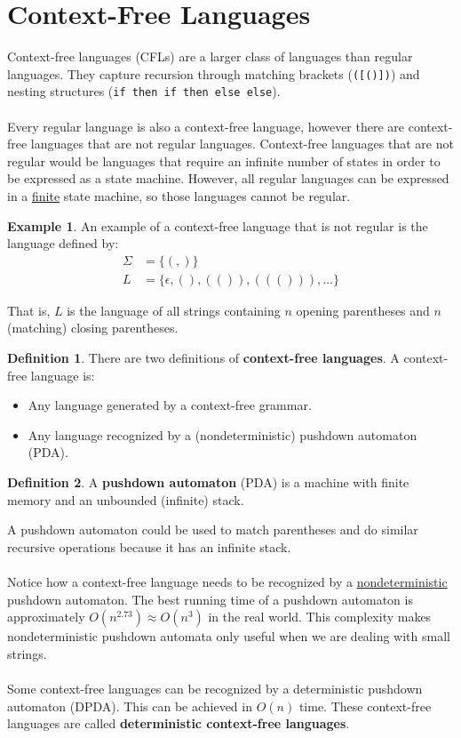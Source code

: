 \documentclass[]{article}
\theoremstyle{definition}
\newtheorem*{defn}{Definition}
\newtheorem{ex}{Example}[section]
\newcommand{\lecture}[1]{\marginpar{{\footnotesize $\leftarrow$ \underline{#1}}}}
\begin{document}
	\section{Context-Free Languages} \lecture{February 25, 2013}
		Context-free languages (CFLs) are a larger class of languages than regular languages. They capture recursion through matching brackets (\verb+([()])+) and nesting structures (\verb+if then if then else else+).
		\\ \\
		Every regular language is also a context-free language, however there are context-free languages that are not regular languages. Context-free languages that are not regular would be languages that require an infinite number of states in order to be expressed as a state machine. However, all regular languages can be expressed in a \underline{finite} state machine, so those languages cannot be regular.
		\begin{ex}
			An example of a context-free language that is not regular is the language defined by:
			\begin{align*}
				\Sigma &= \{ (, ) \} \\
				L &= \{ \epsilon, (), (()), ((())), \ldots \}
			\end{align*}

			That is, $L$ is the language of all strings containing $n$ opening parentheses and $n$ (matching) closing parentheses.
		\end{ex}
		
		\begin{defn}
			There are two definitions of \textbf{context-free languages}. A context-free language is:
			\begin{itemize}
				\item Any language generated by a context-free grammar.
				\item Any language recognized by a (nondeterministic) pushdown automaton (PDA).
			\end{itemize}
		\end{defn}

		\begin{defn}
			A \textbf{pushdown automaton} (PDA) is a machine with finite memory and an unbounded (infinite) stack.
		\end{defn}

		A pushdown automaton could be used to match parentheses and do similar recursive operations because it has an infinite stack.
		\\ \\
		Notice how a context-free language needs to be recognized by a \underline{nondeterministic} pushdown automaton. The best running time of a pushdown automaton is approximately $O(n^{2.73}) \approx O(n^3)$ in the real world. This complexity makes nondeterministic pushdown automata only useful when we are dealing with small strings.
		\\ \\
		Some context-free languages can be recognized by a deterministic pushdown automaton (DPDA). This can be achieved in $O(n)$ time. These context-free languages are called \textbf{deterministic context-free languages}.
\end{document}
